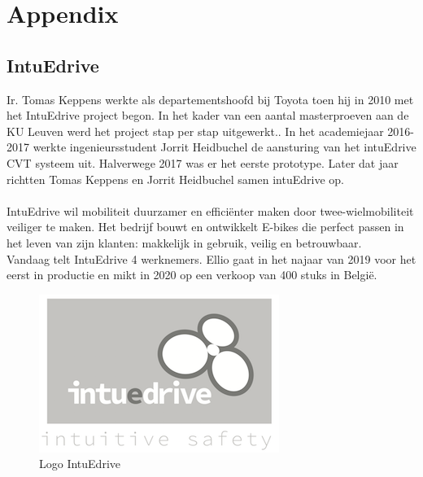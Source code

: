 \chapter*{Appendix}
\section*{IntuEdrive}
Ir. Tomas Keppens werkte als departementshoofd bij Toyota toen hij in 2010 met het IntuEdrive project begon. In het kader van een aantal masterproeven aan de KU Leuven werd het project stap per stap uitgewerkt.. In het academiejaar 2016-2017 werkte ingenieursstudent Jorrit Heidbuchel de aansturing van het intuEdrive CVT systeem uit. Halverwege 2017 was er het eerste prototype. Later dat jaar richtten Tomas Keppens en Jorrit Heidbuchel samen intuEdrive op.
\\\\
IntuEdrive wil mobiliteit duurzamer en efficiënter maken door twee-wielmobiliteit veiliger te maken. Het bedrijf bouwt en ontwikkelt E-bikes die perfect passen in het leven van zijn klanten: makkelijk in gebruik, veilig en betrouwbaar.
\\
Vandaag telt IntuEdrive 4 werknemers. Ellio gaat in het najaar van 2019 voor het eerst in productie en mikt in 2020 op een verkoop van 400 stuks in België.
\begin{figure}[h]
  \centering
  \includegraphics[width=0.5\linewidth]{images/logo_intuedrive.png}
  \caption{Logo IntuEdrive}
  \label{fig:Logo IntuEdrive}
\end{figure}
\newpage
